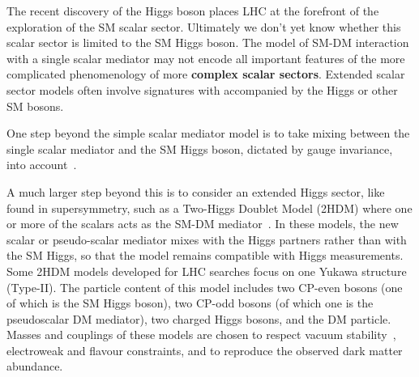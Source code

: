 The recent discovery of the Higgs boson places LHC at the forefront of the exploration of the SM scalar sector. Ultimately we don't yet know whether this scalar sector is limited to the SM Higgs boson. The model of SM-DM interaction with a single scalar mediator may not encode all important features of the more complicated phenomenology of more \textbf{complex scalar sectors}. Extended scalar sector models often involve signatures with \MET accompanied by the Higgs or other SM bosons.

One step beyond the simple scalar mediator model is to take mixing between the single scalar mediator and the SM Higgs boson, dictated by gauge invariance, into account~\cite{Bauer:2016gys,Berlin:2014cfa}. 

A much larger step beyond this is to consider an extended Higgs sector, like found in supersymmetry, such as a Two-Higgs Doublet Model (2HDM) where one or more of the scalars acts as the SM-DM mediator~\cite{Bauer:2017ota,Ipek:2014gua,No:2015xqa,Goncalves:2016iyg,Bell:2016ekl}. In these models, the new scalar or pseudo-scalar mediator mixes with the Higgs partners rather than with the SM Higgs, so that the model remains compatible with Higgs measurements. Some 2HDM models developed for LHC searches focus on one Yukawa structure (Type-II). The particle content of this model includes two CP-even bosons (one of which is the SM Higgs boson), two CP-odd bosons (of which one is the pseudoscalar DM mediator), two charged Higgs bosons, and the DM particle. Masses and couplings of these models are chosen to respect vacuum stability~\cite{No:2015xqa}, electroweak and flavour constraints, and to reproduce the observed dark matter abundance.



